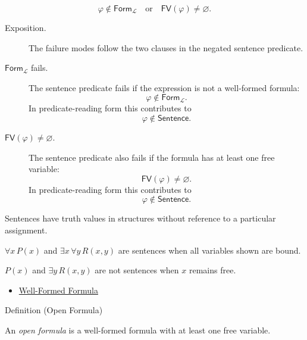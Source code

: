 \begin{remark*}
\[
\varphi\notin\mathsf{Form}_{\mathcal L}
\quad\text{or}\quad
\mathsf{FV}(\varphi)\neq\varnothing.
\]
\end{remark*}

\begin{remark*}
\begin{description}
  \item[Exposition.] The failure modes follow the two clauses in the negated
  sentence predicate.
  \item[\(\mathsf{Form}_{\mathcal L}\) fails.] The sentence predicate fails if
  the expression is not a well-formed formula:
  \[
  \varphi\notin\mathsf{Form}_{\mathcal L}.
  \]
  In predicate-reading form this contributes to
  \[
  \varphi\notin\mathsf{Sentence}.
  \]
  \item[\(\mathsf{FV}(\varphi)\neq\varnothing\).] The sentence predicate also
  fails if the formula has at least one free variable:
  \[
  \mathsf{FV}(\varphi)\neq\varnothing.
  \]
  In predicate-reading form this contributes to
  \[
  \varphi\notin\mathsf{Sentence}.
  \]
\end{description}
\end{remark*}

\begin{remark*}[Interpretation]
Sentences have truth values in structures without reference to a particular
assignment.
\end{remark*}

\begin{remark*}[Examples]
\(\forall x\,P(x)\) and \(\exists x\,\forall y\,R(x,y)\) are sentences when all
variables shown are bound.
\end{remark*}

\begin{remark*}
\(P(x)\) and \(\exists y\,R(x,y)\) are not sentences when \(x\) remains free.
\end{remark*}

\begin{dependencies}
\begin{itemize}
  \item \hyperref[def:wff-pred]{Well-Formed Formula}
\end{itemize}
\end{dependencies}

\begin{definitionbox}{Definition (Open Formula)}
\begin{definition}
\label{def:open-formula-quantifiers}
An \emph{open formula} is a well-formed formula with at least one free
variable.
\end{definition}
\end{definitionbox}

